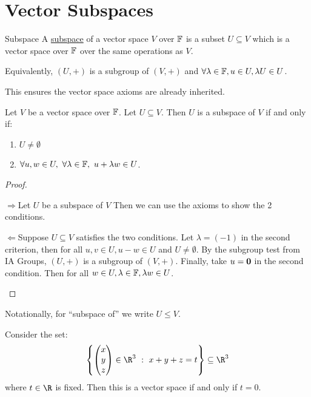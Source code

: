 \documentclass[../Main.tex]{subfiles}
\begin{document}
\section{Vector Subspaces}
\begin{definition}{Subspace}
    A \underline{subspace} of a vector space $V$ over $\mathbb{F}$ is a subset $U \subseteq V$ which is a vector space over $\mathbb{F}$ over the same operations as $V$.

    Equivalently, $(U, +)$ is a subgroup of $(V, +)$ and $\forall \lambda \in \mathbb{F}, u \in U, \lambda U \in U$.
\end{definition}
\begin{remark}
    This ensures the vector space axioms are already inherited.
\end{remark}
\begin{proposition}
    Let $V$ be a vector space over $\mathbb{F}$. Let $U \subseteq V$. Then $U$ is a subspace of $V$ if and only if:
    \begin{enumerate}
        \item $U \neq \emptyset$
        \item $\forall u, w \in U,~\forall \lambda \in \mathbb{F},~ u + \lambda w \in U$.
    \end{enumerate}
    \label{propSubspaceTest}
\end{proposition}
\begin{proof}
    \begin{proofdirection}{$\Rightarrow$}{Let $U$ be a subspace of $V$}
        Then we can use the axioms to show the 2 conditions.
    \end{proofdirection}
    \begin{proofdirection}{$\Leftarrow$}{Suppose $U \subseteq V$ satisfies the two conditions.}
        Let $\lambda = (-1)$ in the second criterion, then for all $u, v \in U, u - w \in U$ and $U \neq \emptyset$. By the subgroup test from IA Groups, $(U, +)$ is a subgroup of $(V, +)$. Finally, take $u = \boldsymbol{0}$ in the second condition. Then for all $w \in U, \lambda \in \mathbb{F}, \lambda w \in U$.
    \end{proofdirection}
\end{proof}
Notationally, for ``subspace of'' we write $U \leq V$.
\begin{example}
    Consider the set:
    \begin{equation*}
        \left\{\begin{pmatrix} x \\ y \\ z\end{pmatrix} \in \R^3~:~x + y + z = t\right\} \subseteq \R^3
    \end{equation*}
    where $t \in \R$ is fixed. Then this is a vector space if and only if $t = 0$.
\end{example}
\end{document}

